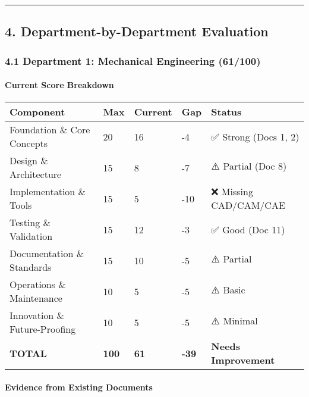 \documentclass[
]{article}
\begin{document}
\begin{center}\rule{0.5\linewidth}{0.5pt}\end{center}

\hypertarget{department-by-department-evaluation}{%
\subsection{4. Department-by-Department
Evaluation}\label{department-by-department-evaluation}}

\hypertarget{department-1-mechanical-engineering-61100}{%
\subsubsection{4.1 Department 1: Mechanical Engineering
(61/100)}\label{department-1-mechanical-engineering-61100}}

\hypertarget{current-score-breakdown}{%
\paragraph{Current Score Breakdown}\label{current-score-breakdown}}

\begin{longtable}[]{@{}lllll@{}}
\toprule\noalign{}
Component & Max & Current & Gap & Status \\
\midrule\noalign{}
\endhead
\bottomrule\noalign{}
\endlastfoot
Foundation \& Core Concepts & 20 & 16 & -4 & ✅ Strong (Docs 1, 2) \\
Design \& Architecture & 15 & 8 & -7 & ⚠️ Partial (Doc 8) \\
Implementation \& Tools & 15 & 5 & -10 & ❌ Missing CAD/CAM/CAE \\
Testing \& Validation & 15 & 12 & -3 & ✅ Good (Doc 11) \\
Documentation \& Standards & 15 & 10 & -5 & ⚠️ Partial \\
Operations \& Maintenance & 10 & 5 & -5 & ⚠️ Basic \\
Innovation \& Future-Proofing & 10 & 5 & -5 & ⚠️ Minimal \\
\textbf{TOTAL} & \textbf{100} & \textbf{61} & \textbf{-39} &
\textbf{Needs Improvement} \\
\end{longtable}

\hypertarget{evidence-from-existing-documents}{%
\paragraph{Evidence from Existing
Documents}\label{evidence-from-existing-documents}}
\end{document}
